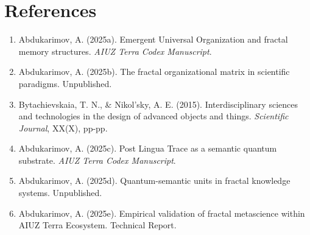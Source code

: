 \documentclass[12pt,a4paper]{article}
\begin{document}
\section*{References}
\begin{enumerate}
    \item Abdukarimov, A. (2025a). Emergent Universal Organization and fractal memory structures. \textit{AIUZ Terra Codex Manuscript}.
    \item Abdukarimov, A. (2025b). The fractal organizational matrix in scientific paradigms. Unpublished.
    \item Bytachievskaia, T. N., \& Nikol’sky, A. E. (2015). Interdisciplinary sciences and technologies in the design of advanced objects and things. \textit{Scientific Journal}, XX(X), pp-pp.
    \item Abdukarimov, A. (2025c). Post Lingua Trace as a semantic quantum substrate. \textit{AIUZ Terra Codex Manuscript}.
    \item Abdukarimov, A. (2025d). Quantum-semantic units in fractal knowledge systems. Unpublished.
    \item Abdukarimov, A. (2025e). Empirical validation of fractal metascience within AIUZ Terra Ecosystem. Technical Report.
\end{enumerate}
\end{document}
